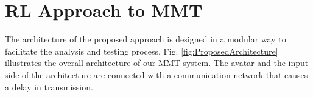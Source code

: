 \documentclass[letterpaper, 10 pt, conference]{ieeeconf}  %
\begin{document}
%

\section{RL Approach to MMT}
\label{section:approach}
The architecture of the proposed approach is designed in a modular way to facilitate the analysis and testing process. Fig. \ref{fig:ProposedArchitecture} illustrates the overall architecture of our MMT system. The avatar and the input side of the architecture are connected with a communication network that causes a delay in transmission.%

\end{document}
